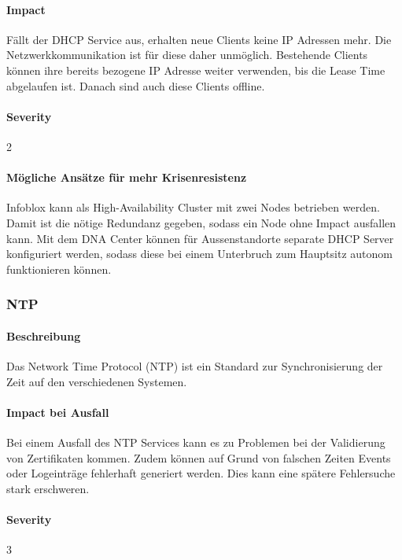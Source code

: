 \paragraph{Impact}

Fällt der DHCP Service aus, erhalten neue Clients keine IP Adressen mehr. Die Netzwerkkommunikation ist für diese daher unmöglich. Bestehende Clients können ihre bereits bezogene IP Adresse weiter verwenden, bis die Lease Time abgelaufen ist. Danach sind auch diese Clients offline.

\paragraph{Severity} 2

\paragraph{Mögliche Ansätze für mehr Krisenresistenz}

Infoblox kann als High-Availability Cluster mit zwei Nodes betrieben werden. Damit ist die nötige Redundanz gegeben, sodass ein Node ohne Impact ausfallen kann. Mit dem DNA Center können für Aussenstandorte separate DHCP Server konfiguriert werden, sodass diese bei einem Unterbruch zum Hauptsitz autonom funktionieren können.


\subsubsection{NTP}
\paragraph{Beschreibung}
Das Network Time Protocol (NTP) ist ein Standard zur Synchronisierung der Zeit auf den verschiedenen Systemen.

\paragraph{Impact bei Ausfall}
Bei einem Ausfall des NTP Services kann es zu Problemen bei der Validierung von Zertifikaten kommen. Zudem können auf Grund von falschen Zeiten Events oder Logeinträge fehlerhaft generiert werden. Dies kann eine spätere Fehlersuche stark erschweren.

\paragraph{Severity} 3

